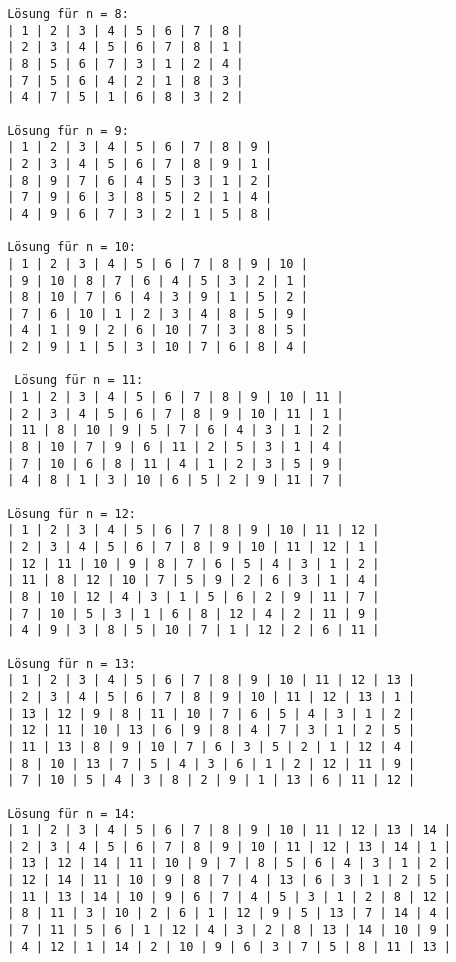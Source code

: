 \documentclass[a4paper, notitlepage, 12pt]{scrartcl}
\begin{document}
 \begin{center}
 \begin{Verbatim}
 Lösung für n = 8:
 | 1 | 2 | 3 | 4 | 5 | 6 | 7 | 8 | 
 | 2 | 3 | 4 | 5 | 6 | 7 | 8 | 1 | 
 | 8 | 5 | 6 | 7 | 3 | 1 | 2 | 4 | 
 | 7 | 5 | 6 | 4 | 2 | 1 | 8 | 3 | 
 | 4 | 7 | 5 | 1 | 6 | 8 | 3 | 2 | 
 
 Lösung für n = 9:
 | 1 | 2 | 3 | 4 | 5 | 6 | 7 | 8 | 9 | 
 | 2 | 3 | 4 | 5 | 6 | 7 | 8 | 9 | 1 | 
 | 8 | 9 | 7 | 6 | 4 | 5 | 3 | 1 | 2 | 
 | 7 | 9 | 6 | 3 | 8 | 5 | 2 | 1 | 4 | 
 | 4 | 9 | 6 | 7 | 3 | 2 | 1 | 5 | 8 | 
 
 Lösung für n = 10:
 | 1 | 2 | 3 | 4 | 5 | 6 | 7 | 8 | 9 | 10 | 
 | 9 | 10 | 8 | 7 | 6 | 4 | 5 | 3 | 2 | 1 | 
 | 8 | 10 | 7 | 6 | 4 | 3 | 9 | 1 | 5 | 2 | 
 | 7 | 6 | 10 | 1 | 2 | 3 | 4 | 8 | 5 | 9 | 
 | 4 | 1 | 9 | 2 | 6 | 10 | 7 | 3 | 8 | 5 | 
 | 2 | 9 | 1 | 5 | 3 | 10 | 7 | 6 | 8 | 4 | 
 
  Lösung für n = 11:
 | 1 | 2 | 3 | 4 | 5 | 6 | 7 | 8 | 9 | 10 | 11 | 
 | 2 | 3 | 4 | 5 | 6 | 7 | 8 | 9 | 10 | 11 | 1 | 
 | 11 | 8 | 10 | 9 | 5 | 7 | 6 | 4 | 3 | 1 | 2 | 
 | 8 | 10 | 7 | 9 | 6 | 11 | 2 | 5 | 3 | 1 | 4 | 
 | 7 | 10 | 6 | 8 | 11 | 4 | 1 | 2 | 3 | 5 | 9 | 
 | 4 | 8 | 1 | 3 | 10 | 6 | 5 | 2 | 9 | 11 | 7 | 
 
 Lösung für n = 12:
 | 1 | 2 | 3 | 4 | 5 | 6 | 7 | 8 | 9 | 10 | 11 | 12 | 
 | 2 | 3 | 4 | 5 | 6 | 7 | 8 | 9 | 10 | 11 | 12 | 1 | 
 | 12 | 11 | 10 | 9 | 8 | 7 | 6 | 5 | 4 | 3 | 1 | 2 | 
 | 11 | 8 | 12 | 10 | 7 | 5 | 9 | 2 | 6 | 3 | 1 | 4 | 
 | 8 | 10 | 12 | 4 | 3 | 1 | 5 | 6 | 2 | 9 | 11 | 7 | 
 | 7 | 10 | 5 | 3 | 1 | 6 | 8 | 12 | 4 | 2 | 11 | 9 | 
 | 4 | 9 | 3 | 8 | 5 | 10 | 7 | 1 | 12 | 2 | 6 | 11 | 
 
 Lösung für n = 13:
 | 1 | 2 | 3 | 4 | 5 | 6 | 7 | 8 | 9 | 10 | 11 | 12 | 13 | 
 | 2 | 3 | 4 | 5 | 6 | 7 | 8 | 9 | 10 | 11 | 12 | 13 | 1 | 
 | 13 | 12 | 9 | 8 | 11 | 10 | 7 | 6 | 5 | 4 | 3 | 1 | 2 | 
 | 12 | 11 | 10 | 13 | 6 | 9 | 8 | 4 | 7 | 3 | 1 | 2 | 5 | 
 | 11 | 13 | 8 | 9 | 10 | 7 | 6 | 3 | 5 | 2 | 1 | 12 | 4 | 
 | 8 | 10 | 13 | 7 | 5 | 4 | 3 | 6 | 1 | 2 | 12 | 11 | 9 | 
 | 7 | 10 | 5 | 4 | 3 | 8 | 2 | 9 | 1 | 13 | 6 | 11 | 12 | 
 
 Lösung für n = 14:
 | 1 | 2 | 3 | 4 | 5 | 6 | 7 | 8 | 9 | 10 | 11 | 12 | 13 | 14 | 
 | 2 | 3 | 4 | 5 | 6 | 7 | 8 | 9 | 10 | 11 | 12 | 13 | 14 | 1 | 
 | 13 | 12 | 14 | 11 | 10 | 9 | 7 | 8 | 5 | 6 | 4 | 3 | 1 | 2 | 
 | 12 | 14 | 11 | 10 | 9 | 8 | 7 | 4 | 13 | 6 | 3 | 1 | 2 | 5 | 
 | 11 | 13 | 14 | 10 | 9 | 6 | 7 | 4 | 5 | 3 | 1 | 2 | 8 | 12 | 
 | 8 | 11 | 3 | 10 | 2 | 6 | 1 | 12 | 9 | 5 | 13 | 7 | 14 | 4 | 
 | 7 | 11 | 5 | 6 | 1 | 12 | 4 | 3 | 2 | 8 | 13 | 14 | 10 | 9 | 
 | 4 | 12 | 1 | 14 | 2 | 10 | 9 | 6 | 3 | 7 | 5 | 8 | 11 | 13 | 
 

\end{Verbatim}
\end{center}
\end{document}
